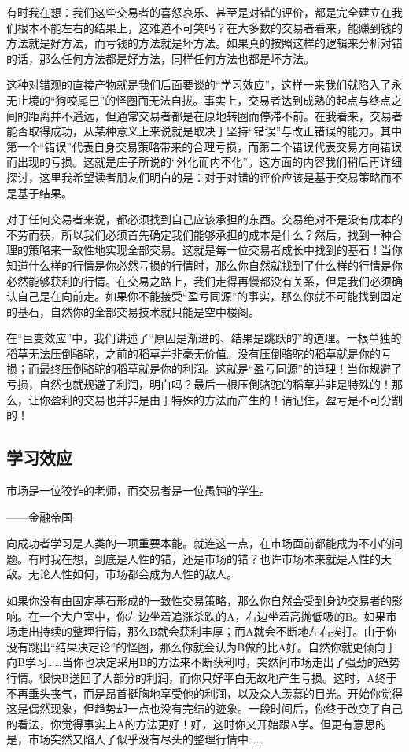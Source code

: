 有时我在想：我们这些交易者的喜怒哀乐、甚至是对错的评价，都是完全建立在我们根本不能左右的结果上，这难道不可笑吗？在大多数的交易者看来，能赚到钱的方法就是好方法，而亏钱的方法就是坏方法。如果真的按照这样的逻辑来分析对错的话，那么任何方法都是好方法，同样任何方法也都是坏方法。

这种对错观的直接产物就是我们后面要谈的“学习效应”，这样一来我们就陷入了永无止境的“狗咬尾巴”的怪圈而无法自拔。事实上，交易者达到成熟的起点与终点之间的距离并不遥远，但通常交易者都是在原地转圈而停滞不前。在我看来，交易者能否取得成功，从某种意义上来说就是取决于坚持“错误”与改正错误的能力。其中第一个“错误”代表自身交易策略带来的合理亏损，而第二个错误代表交易方向错误而出现的亏损。这就是庄子所说的“外化而内不化”。这方面的内容我们稍后再详细探讨，这里我希望读者朋友们明白的是：对于对错的评价应该是基于交易策略而不是基于结果。

对于任何交易者来说，都必须找到自己应该承担的东西。交易绝对不是没有成本的不劳而获，所以我们必须首先确定我们能够承担的成本是什么？然后，找到一种合理的策略来一致性地实现全部交易。这就是每一位交易者成长中找到的基石！当你知道什么样的行情是你必然亏损的行情时，那么你自然就找到了什么样的行情是你必然能够获利的行情。在交易之路上，我们走得再慢都没有关系，但是我们必须确认自己是在向前走。如果你不能接受“盈亏同源”的事实，那么你就不可能找到固定的基石，自然你的全部交易技术就只能是空中楼阁。

在“巨变效应”中，我们讲述了“原因是渐进的、结果是跳跃的”的道理。一根单独的稻草无法压倒骆驼，之前的稻草并非毫无价值。没有压倒骆驼的稻草就是你的亏损；而最终压倒骆驼的稻草就是你的利润。这就是“盈亏同源”的道理！当你规避了亏损，自然也就规避了利润，明白吗？最后一根压倒骆驼的稻草并非是特殊的！那么，让你盈利的交易也并非是由于特殊的方法而产生的！请记住，盈亏是不可分割的！

\subsection{学习效应}

{\kaishu
市场是一位狡诈的老师，而交易者是一位愚钝的学生。

\hfill ——金融帝国
}

向成功者学习是人类的一项重要本能。就连这一点，在市场面前都能成为不小的问题。有时我在想，到底是人性的错，还是市场的错？也许市场本来就是人性的天敌。无论人性如何，市场都会成为人性的敌人。

如果你没有由固定基石形成的一致性交易策略，那么你自然会受到身边交易者的影响。在一个大户室中，你左边坐着追涨杀跌的A，右边坐着高抛低吸的B。如果市场走出持续的整理行情，那么B就会获利丰厚；而A就会不断地左右挨打。由于你没有跳出“结果决定论”的怪圈，那么你就会认为B做的比A好。自然你就更倾向于向B学习……当你也决定采用B的方法来不断获利时，突然间市场走出了强劲的趋势行情。很快B送回了大部分的利润，而你只好平白无故地产生亏损。这时，A终于不再垂头丧气，而是昂首挺胸地享受他的利润，以及众人羡慕的目光。开始你觉得这是偶然现象，但趋势却一点也没有完结的迹象。一段时间后，你终于改变了自己的看法，你觉得事实上A的方法更好！好，这时你又开始跟A学。但更有意思的是，市场突然又陷入了似乎没有尽头的整理行情中……

